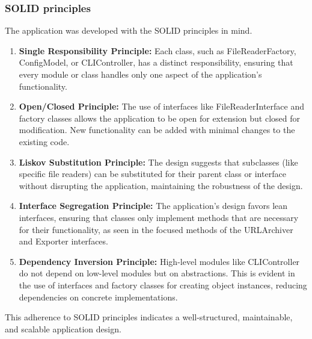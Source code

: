 \subsubsection{SOLID principles}
The application was developed with the SOLID principles in mind. 
\begin{enumerate}
    \item \textbf{Single Responsibility Principle:} Each class, such as FileReaderFactory, ConfigModel, or CLIController, has a distinct responsibility, ensuring that every module or class handles only one aspect of the application's functionality.
    \item \textbf{Open/Closed Principle:} The use of interfaces like FileReaderInterface and factory classes allows the application to be open for extension but closed for modification. New functionality can be added with minimal changes to the existing code.
    \item \textbf{Liskov Substitution Principle:} The design suggests that subclasses (like specific file readers) can be substituted for their parent class or interface without disrupting the application, maintaining the robustness of the design.
    \item \textbf{Interface Segregation Principle:} The application's design favors lean interfaces, ensuring that classes only implement methods that are necessary for their functionality, as seen in the focused methods of the URLArchiver and Exporter interfaces.
    \item \textbf{Dependency Inversion Principle:} High-level modules like CLIController do not depend on low-level modules but on abstractions. This is evident in the use of interfaces and factory classes for creating object instances, reducing dependencies on concrete implementations.
\end{enumerate}

This adherence to SOLID principles indicates a well-structured, maintainable, and scalable application design.
\clearpage